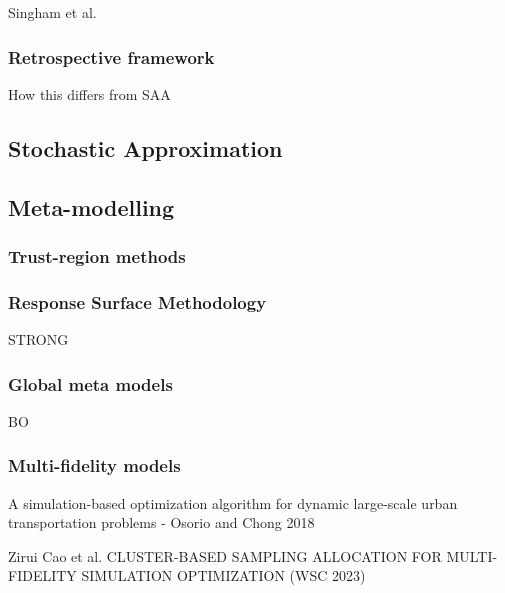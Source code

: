 \documentclass{article}
\begin{document}
Singham et al. 

\subsubsection{Retrospective framework}

How this differs from SAA

\subsection{Stochastic Approximation}

\subsection{Meta-modelling}

\subsubsection{Trust-region methods}

\subsubsection{Response Surface Methodology}

STRONG

\subsubsection{Global meta models}

BO

\subsubsection{Multi-fidelity models}

A simulation-based optimization algorithm for dynamic large-scale urban transportation problems - Osorio and Chong 2018 \newline

Zirui Cao et al. CLUSTER-BASED SAMPLING ALLOCATION FOR MULTI-FIDELITY SIMULATION OPTIMIZATION (WSC 2023)
\end{document}
